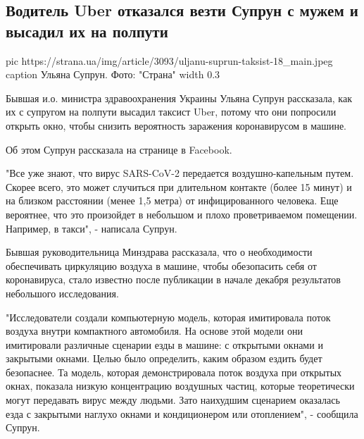  
 
 
 
 
 
\subsection{Водитель Uber отказался везти Супрун с мужем и высадил их на полпути}
\label{sec:29_12_2020.news.ua.strana.3.voditel_uber_suprun}

\ifcmt
  pic https://strana.ua/img/article/3093/uljanu-suprun-taksist-18_main.jpeg
	caption Ульяна Супрун. Фото: "Страна" 
	width 0.3
\fi

Бывшая и.о. министра здравоохранения Украины Ульяна Супрун рассказала, как их с
супругом на полпути высадил таксист Uber, потому что они попросили открыть
окно, чтобы снизить вероятность заражения коронавирусом в машине. 

Об этом Супрун рассказала на странице в Facebook.

"Все уже знают, что вирус SARS-CoV-2 передается воздушно-капельным путем.
Скорее всего, это может случиться при длительном контакте (более 15 минут) и на
близком расстоянии (менее 1,5 метра) от инфицированного человека. Еще
вероятнее, что это произойдет в небольшом и плохо проветриваемом помещении.
Например, в такси", - написала Супрун.

Бывшая руководительница Минздрава рассказала, что о необходимости обеспечивать
циркуляцию воздуха в машине, чтобы обезопасить себя от коронавируса, стало
известно после публикации в начале декабря результатов небольшого исследования. 

"Исследователи создали компьютерную модель, которая имитировала поток воздуха
внутри компактного автомобиля. На основе этой модели они имитировали различные
сценарии езды в машине: с открытыми окнами и закрытыми окнами. Целью было
определить, каким образом ездить будет безопаснее. Та модель, которая
демонстрировала поток воздуха при открытых окнах, показала низкую концентрацию
воздушных частиц, которые теоретически могут передавать вирус между людьми.
Зато наихудшим сценарием оказалась езда с закрытыми наглухо окнами и
кондиционером или отоплением", - сообщила Супрун. 

